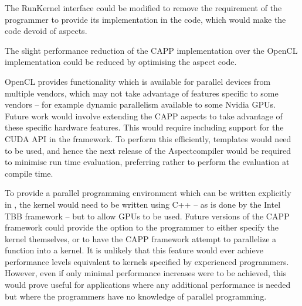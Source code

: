 \documentclass{sig-alternate-05-2015}
\begin{document}
The RunKernel interface could be modified to remove the requirement of the programmer to provide its
implementation in the \CPP code, which would make the \CPP code devoid of aspects.

The slight performance reduction of the CAPP implementation over the
OpenCL implementation could be reduced by optimising the aspect code.

OpenCL provides functionality which is available for parallel devices from
multiple vendors, which may not take advantage of features specific to some
vendors -- for example dynamic parallelism available to some Nvidia GPUs.
Future work would involve extending the CAPP aspects to take advantage
of these specific hardware features. This would require including support for the CUDA API
in the framework. To perform this efficiently, templates would need to be used, and
hence the next release of the Aspect\CPP compiler would be required to
minimise run time evaluation, preferring rather to perform the evaluation at compile time.

To provide a parallel programming environment which can be written explicitly in
\CPP, the kernel would need to be written using C++ -- as is done by the Intel TBB framework -- but to allow
GPUs to be used. Future versions of the
 CAPP framework could provide the option to the programmer to either specify
the kernel themselves, or to have the  CAPP framework attempt to
parallelize a \CPP function into a kernel. It is unlikely that this feature would
ever achieve performance levels equivalent to kernels specified by experienced
programmers. However, even if only minimal performance increases were to be achieved, this would prove 
useful for applications where any additional performance is needed but where the
programmers have no knowledge of parallel programming. 



%
%
%

\end{document}
